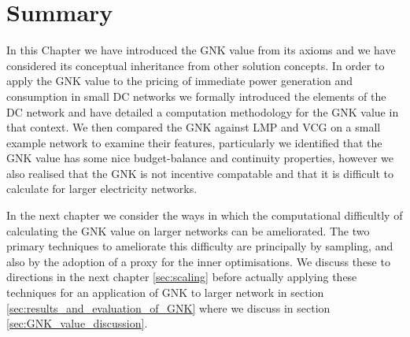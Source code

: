 \section{Summary}

In this Chapter we have introduced the GNK value from its axioms and we have considered its conceptual inheritance from other solution concepts.
In order to apply the GNK value to the pricing of immediate power generation and consumption in small DC networks we formally introduced the elements of the DC network and have detailed a computation methodology for the GNK value in that context.
We then compared the GNK against LMP and VCG on a small example network to examine their features, particularly we identified that the GNK value has some nice budget-balance and continuity properties, however we also realised that the GNK is not incentive compatable and that it is difficult to calculate for larger electricity networks.

In the next chapter we consider the ways in which the computational difficultly of calculating the GNK value on larger networks can be ameliorated.
The two primary techniques to ameliorate this difficulty are principally by sampling, and also by the adoption of a proxy for the inner optimisations.
We discuss these to directions in the next chapter \ref{sec:scaling} before actually applying these techniques for an application of GNK to larger network in section \ref{sec:results_and_evaluation_of_GNK} where we discuss in section \ref{sec:GNK_value_discussion}.









